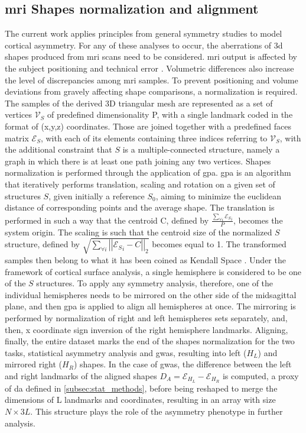 \subsection{\Ac{mri} Shapes normalization and alignment}\label{subsec:shape_normalization}
The current work applies principles from general symmetry studies to model cortical asymmetry. For any of these analyses to occur, the aberrations of \ac{3d} shapes produced from \ac{mri} scans need to be considered. \Ac{mri} output is affected by the subject positioning and technical error \cite{Wittens2021}.  Volumetric differences also increase the level of discrepancies among \ac{mri} samples.  To prevent positioning and volume deviations from gravely affecting shape comparisons, a normalization is required\cite{Klingenberg2020}. The samples of the derived 3D triangular mesh are represented as a set of vertices $\mathcal{V}_S$ of predefined dimensionality P, with a single landmark coded in the format of (x,y,z) coordinates. Those are joined together with a predefined faces matrix $\mathcal{E}_S$, with each of its elements containing three indices referring to $\mathcal{V}_S$, with the additional constraint that $S$ is a multiple-connected structure, namely a graph in which there is at least one path joining any two vertices. Shapes normalization is performed through the application of \ac{gpa}. \Ac{gpa} is an algorithm that iteratively performs translation, scaling and rotation on a given set of structures $S$, given initially a reference $S_0$, aiming to minimize the euclidean distance of corresponding points and the average shape. The translation is performed in such a way that the centroid C, defined by $\frac{\sum_{\forall i}{\mathcal{E}_S}_i}{P}$, becomes the system origin. The scaling is such that the centroid size of the normalized $S$ structure, defined by $\sqrt{\sum_{\forall i}{\left|\left|{\mathcal{E}_S}_i-C\right|\right|_2}}$ becomes equal to 1. The transformed samples then belong to what it has been coined as Kendall Space \cite{Klingenberg2020}.  Under the framework of cortical surface analysis, a single hemisphere is considered to be one of the $S$ structures. To apply any symmetry analysis, therefore, one of the individual hemispheres needs to be mirrored on the other side of the midsagittal plane, and then \ac{gpa} is applied to align all hemispheres at once. The mirroring is performed by normalization of right and left hemispheres sets separately, and, then, x coordinate sign inversion of the right hemisphere landmarks. Aligning, finally, the entire dataset marks the end of the shapes normalization for the two tasks, statistical asymmetry analysis and \ac{gwas}, resulting into left ($H_L$) and mirrored right ($H_R$) shapes. In the case of \ac{gwas}, the difference between the left and right landmarks of the aligned shapes $D_A=\mathcal{E}_{H_L}-\mathcal{E}_{H_R}$ is computed, a proxy of \ac{da} defined in \autoref{subsec:stat_methods}, before being reshaped to merge the dimensions of L landmarks and coordinates, resulting in an array with size $N\times3L$. This structure plays the role of the asymmetry phenotype in further analysis. 

